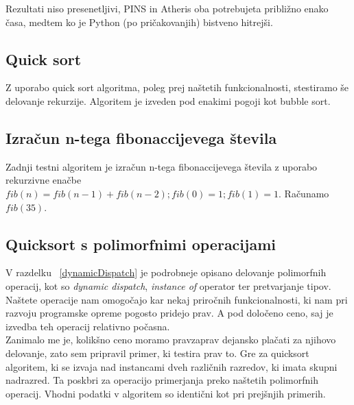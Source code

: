 \documentclass[a4paper, 12p]{book}
\begin{document}
Rezultati niso presenetljivi, PINS in Atheris oba potrebujeta približno enako časa, medtem ko je Python (po pričakovanjih) bistveno hitrejši.

\subsection{Quick sort}

Z uporabo quick sort algoritma, poleg prej naštetih funkcionalnosti, stestiramo še delovanje rekurzije. Algoritem je izveden pod enakimi pogoji kot bubble sort. \\


\subsection{Izračun n-tega fibonaccijevega števila}

Zadnji testni algoritem je izračun n-tega fibonaccijevega števila z uporabo rekurzivne enačbe
$fib(n) = fib(n - 1) + fib(n - 2) ; fib(0) = 1; fib(1) = 1$. Računamo $fib(35)$. \\


\subsection{Quicksort s polimorfnimi operacijami}

V razdelku ~\ref{dynamicDispatch} je podrobneje opisano delovanje polimorfnih operacij, kot so \textit{dynamic dispatch}, \textit{instance of} operator ter pretvarjanje tipov. Naštete operacije nam omogočajo kar nekaj priročnih funkcionalnosti, ki nam pri razvoju programske opreme pogosto pridejo prav. A pod določeno ceno, saj je izvedba teh operacij relativno počasna. \\
\indent Zanimalo me je, kolikšno ceno moramo pravzaprav dejansko plačati za njihovo delovanje, zato sem pripravil primer, ki testira prav to. Gre za quicksort algoritem, ki se izvaja nad instancami dveh različnih razredov, ki imata skupni nadrazred. Ta poskbri za operacijo primerjanja preko naštetih polimorfnih operacij. Vhodni podatki v algoritem so identični kot pri prejšnjih primerih. \\
\end{document}
